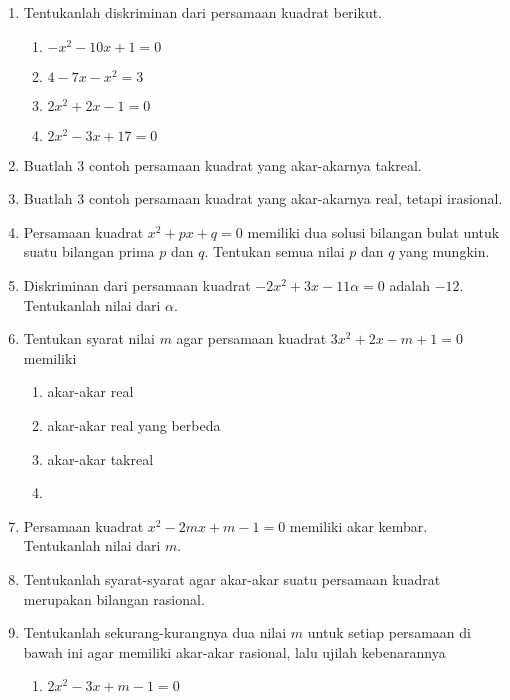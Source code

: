 \begin{enumerate}[nosep]
			\item Tentukanlah diskriminan dari persamaan kuadrat berikut.
			\begin{multcols}
				\begin{enumerate}
					\item $ -x^{2} - 10x + 1 = 0 $
					\item $ 4 - 7x - x^{2} = 3 $
					\item $ 2x^{2} + 2x - 1 = 0 $
					\item $ 2x^{2} - 3x + 17 = 0 $
				\end{enumerate}
			\end{multcols}
			\item Buatlah 3 contoh persamaan kuadrat yang akar-akarnya takreal.
			\item Buatlah 3 contoh persamaan kuadrat yang akar-akarnya real, tetapi irasional.
			\item Persamaan kuadrat $ x^{2} + px + q = 0 $ memiliki dua solusi bilangan bulat untuk suatu bilangan prima $ p $ dan $ q $. Tentukan semua nilai $ p $ dan $ q $ yang mungkin.
			\item Diskriminan dari persamaan kuadrat $ -2x^{2} + 3x - 11\alpha = 0 $ adalah $ -12 $. Tentukanlah nilai dari $ \alpha $.
			\item Tentukan syarat nilai $ m $ agar persamaan kuadrat $ 3x^{2} + 2x - m + 1 = 0 $ memiliki
			\begin{multcols}
				\begin{enumerate}
					\item akar-akar real
					\item akar-akar real yang berbeda
					\item akar-akar takreal
					\item[]
				\end{enumerate}
			\end{multcols}
			\item Persamaan kuadrat $ x^{2} - 2mx + m - 1 = 0 $ memiliki akar kembar. Tentukanlah nilai dari $ m $.
			\item {} Tentukanlah syarat-syarat agar akar-akar suatu persamaan kuadrat merupakan bilangan rasional.
			\item Tentukanlah sekurang-kurangnya dua nilai $ m $ untuk setiap persamaan di bawah ini agar memiliki akar-akar rasional, lalu ujilah kebenarannya
			\begin{multcols}
				\begin{enumerate}
					\item $ 2x^{2} - 3x + m - 1 = 0 $

\end{enumerate}
\end{multcols}
\end{enumerate}
